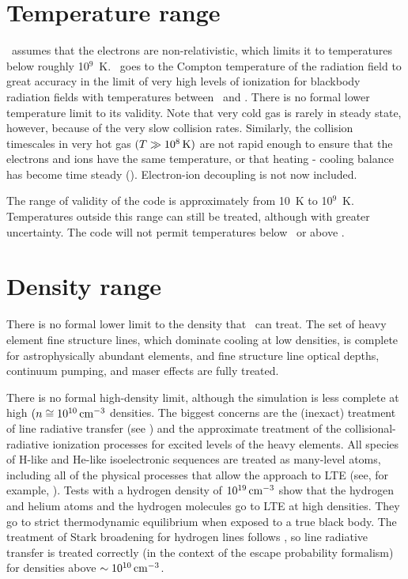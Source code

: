 \section{Temperature range}

\Cloudy\ assumes that the electrons are non-relativistic, which limits
it to temperatures below roughly 10$^9$~K.
\Cloudy\ goes to the Compton
temperature of the radiation field to great accuracy in the limit of very
high levels of ionization for blackbody radiation fields with temperatures
between \TempLimitLow\ and \TempLimitHigh.
There is no formal lower temperature limit to
its validity.
Note that very cold gas is rarely in steady state, however,
because of the very slow collision rates.
Similarly, the collision
timescales in very hot gas $(T \gg 10^8 {\rm\thinspace K})$ are not rapid enough
to ensure that
the electrons and ions have the same temperature,
or that heating - cooling
balance has become time steady (\citealp{Johnson2007}).
Electron-ion
decoupling is not now included.

The range of validity of the code is approximately from 10~K to 10$^9$~K.
Temperatures outside this range can still be treated,
although with greater
uncertainty.
The code will not permit temperatures below \TempLimitLow\ or above
\TempLimitHigh.

\section{Density range}

There is no formal lower limit to the density that \Cloudy\ can treat.
The set of heavy element fine structure lines, which dominate cooling at
low densities, is complete for astrophysically abundant elements, and fine
structure line optical depths, continuum pumping, and maser effects are
fully treated.

There is no formal high-density limit, although the simulation is less
complete at high $(n \cong 10^{10} {\rm\thinspace cm^{-3}}$ densities.
The biggest concerns are the
(inexact) treatment of line radiative transfer (see \citealp{Avrett1988})
and the approximate treatment of the collisional-radiative ionization
processes for excited levels of the heavy elements.
All species of H-like
and He-like isoelectronic sequences are treated as many-level atoms,
including all of the physical processes that allow the approach
to LTE (see, for example, \citealp{Mihalas1978}).
Tests with a hydrogen density of $10^{19} {\rm\thinspace cm^{-3}}$
show that the hydrogen and helium atoms and the hydrogen molecules go to
LTE at high densities.
They go to strict thermodynamic equilibrium when
exposed to a true black body.
The treatment of Stark broadening for hydrogen
lines follows \citet{Puetter1981},
so line radiative transfer is treated correctly
(in the context of the escape probability formalism) for densities above
$\sim10^{10} {\rm\thinspace cm^{-3}}$.

